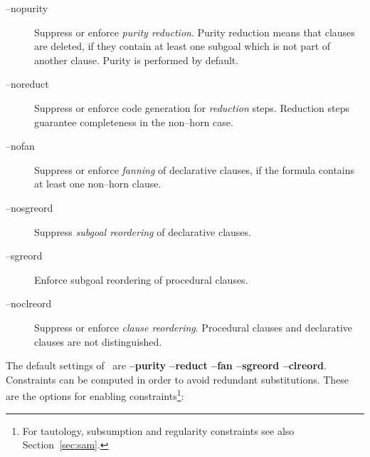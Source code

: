 \begin{description}
      \item[--\lb no\rb purity]
           {Suppress or enforce {\it purity reduction\/}. Purity
            reduction means that 
            clauses are deleted, if they contain at least one subgoal
            which is not part of another clause. Purity is performed
            by default.} 
      \item[--\lb no\rb reduct]
           {Suppress or enforce code  generation  for {\it
            reduction\/} steps.  Reduction  steps  guarantee
            completeness in the non--horn case.} 
      \item[--\lb no\rb fan]
           {Suppress or enforce {\it fanning\/} of declarative
            clauses, if the 
            formula contains at least one non--horn clause.}
      \item[--nosgreord]
           {Suppress   {\it subgoal   reordering\/}    of declarative 
            clauses.}  
      \item[--sgreord]
           {Enforce subgoal reordering of procedural clauses.}
      \item[--\lb no\rb clreord]
           {Suppress or enforce {\it clause reordering\/}. Procedural
            clauses and declarative clauses are not distinguished.} 
\end{description}

The default settings of \inw\ are {\bf --purity --reduct --fan
--sgreord  --clreord}. 
Constraints can be computed in order to avoid redundant
substitutions. These are the options for enabling
constraints\footnote{For tautology, subsumption and regularity
constraints see also Section~\ref{sec:sam}.}: 

